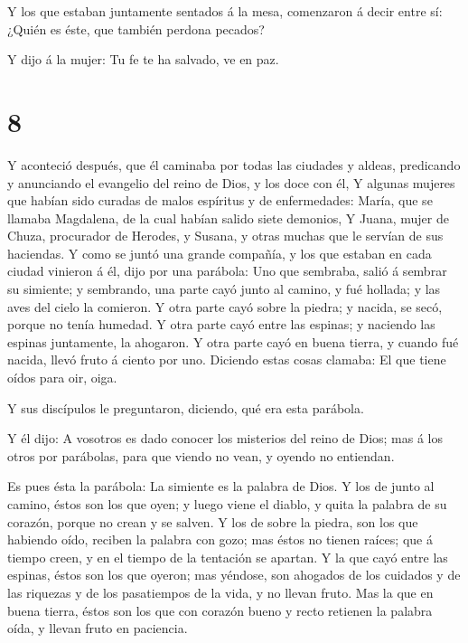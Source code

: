  Y los que estaban juntamente sentados á la mesa,
comenzaron á decir entre sí: ¿Quién es éste, que también perdona
pecados?

 Y dijo á la mujer: Tu fe te ha salvado, ve en paz.

\hypertarget{section-7}{%
\section{8}\label{section-7}}

 Y aconteció después, que él caminaba por todas las ciudades
y aldeas, predicando y anunciando el evangelio del reino de Dios, y los
doce con él,  Y algunas mujeres que habían sido curadas de
malos espíritus y de enfermedades: María, que se llamaba Magdalena, de
la cual habían salido siete demonios,  Y Juana, mujer de
Chuza, procurador de Herodes, y Susana, y otras muchas que le servían de
sus haciendas.  Y como se juntó una grande compañía, y los
que estaban en cada ciudad vinieron á él, dijo por una parábola:
 Uno que sembraba, salió á sembrar su simiente; y sembrando,
una parte cayó junto al camino, y fué hollada; y las aves del cielo la
comieron.  Y otra parte cayó sobre la piedra; y nacida, se
secó, porque no tenía humedad.  Y otra parte cayó entre las
espinas; y naciendo las espinas juntamente, la ahogaron.  Y
otra parte cayó en buena tierra, y cuando fué nacida, llevó fruto á
ciento por uno. Diciendo estas cosas clamaba: El que tiene oídos para
oir, oiga.

 Y sus discípulos le preguntaron, diciendo, qué era esta
parábola.

 Y él dijo: A vosotros es dado conocer los misterios del
reino de Dios; mas á los otros por parábolas, para que viendo no vean, y
oyendo no entiendan.

 Es pues ésta la parábola: La simiente es la palabra de
Dios.  Y los de junto al camino, éstos son los que oyen; y
luego viene el diablo, y quita la palabra de su corazón, porque no crean
y se salven.  Y los de sobre la piedra, son los que
habiendo oído, reciben la palabra con gozo; mas éstos no tienen raíces;
que á tiempo creen, y en el tiempo de la tentación se apartan.
 Y la que cayó entre las espinas, éstos son los que oyeron;
mas yéndose, son ahogados de los cuidados y de las riquezas y de los
pasatiempos de la vida, y no llevan fruto.  Mas la que en
buena tierra, éstos son los que con corazón bueno y recto retienen la
palabra oída, y llevan fruto en paciencia.

